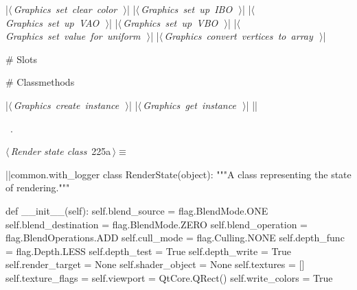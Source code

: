 \documentclass[%
    a4paper,    %
    justified,  %
    nobib,      %
    openany     %
]{tufte-book}
\makeatletter
\renewcommand{\label}[1]{\@tufte@label{##1}}%
\makeatother
\begin{document}
\begin{fullwidth}
\begin{flushleft}
\begin{minipage}{\linewidth}
\begin{pythoncode}
    |\hbox{$\langle\,${\itshape Graphics set clear color}\nobreak\ {\footnotesize {}}$\,\rangle$}|
    |\hbox{$\langle\,${\itshape Graphics set up IBO}\nobreak\ {\footnotesize {}}$\,\rangle$}|
    |\hbox{$\langle\,${\itshape Graphics set up VAO}\nobreak\ {\footnotesize {}}$\,\rangle$}|
    |\hbox{$\langle\,${\itshape Graphics set up VBO}\nobreak\ {\footnotesize {}}$\,\rangle$}|
    |\hbox{$\langle\,${\itshape Graphics set value for uniform}\nobreak\ {\footnotesize {}}$\,\rangle$}|
    |\hbox{$\langle\,${\itshape Graphics convert vertices to array}\nobreak\ {\footnotesize {}}$\,\rangle$}|

    # Slots

    # Classmethods

    |\hbox{$\langle\,${\itshape Graphics create instance}\nobreak\ {\footnotesize {}}$\,\rangle$}|
    |\hbox{$\langle\,${\itshape Graphics get instance}\nobreak\ {\footnotesize {}}$\,\rangle$}|
|\NWsep|
\end{pythoncode}
\vspace{1.5ex}
\footnotesize
\begin{list}{}{\setlength{\itemsep}{-\parsep}\setlength{\itemindent}{-\leftmargin}}
\item \NWtxtMacroRefIn\ .

\item{}
\end{list}
\end{minipage}\vspace{4ex}
\end{flushleft}
\begin{flushleft} \small
\begin{minipage}{\linewidth}\label{scrap231}\raggedright\small
{} $\langle\,${\itshape Render state class}\nobreak\ {\footnotesize {225a}}$\,\rangle\equiv$
\vspace{-1ex}
\begin{pythoncode}
|\normalfont{}\fontfamily{}|common.with_logger
class RenderState(object):
    """A class representing the state of rendering."""

    def __init__(self):
        self.blend_source      = flag.BlendMode.ONE
        self.blend_destination = flag.BlendMode.ZERO
        self.blend_operation   = flag.BlendOperations.ADD
        self.cull_mode         = flag.Culling.NONE
        self.depth_func        = flag.Depth.LESS
        self.depth_test        = True
        self.depth_write       = True
        self.render_target     = None
        self.shader_object     = None
        self.textures          = []
        self.texture_flags     = {}
        self.viewport          = QtCore.QRect()
        self.write_colors      = True


\end{pythoncode}
\end{minipage}
\end{flushleft}
\end{fullwidth}
\end{document}
